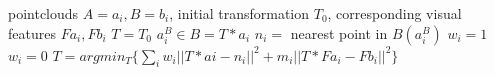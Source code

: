 \documentclass[letterpaper, 10pt, conference]{ieeeconf}
\begin{document}
\begin{algorithm}
\begin{algorithmic}
\REQUIRE pointclouds $A = a_{i}, B = b_{i}$, initial transformation $T_{0}$, corresponding visual features $Fa_{i}, Fb_{i}$
\STATE $T = T_{0}$
\STATE $a^{B}_{i} \in B = T * a_i$
\STATE $n_{i} = $ nearest point in $B(a^{B}_{i})$
    \STATE $w_i = 1$
\ELSE
    \STATE $w_i = 0$
\ENDIF
\ENDFOR
\STATE $T = argmin_{T} \{\sum_{i} w_{i}||T*a{i} - n_{i} ||^2 + m_{i} ||T*Fa_{i} - Fb_{i}||^2\} $
\ENDWHILE
\end{algorithmic}
\end{algorithm}

\end{document}

